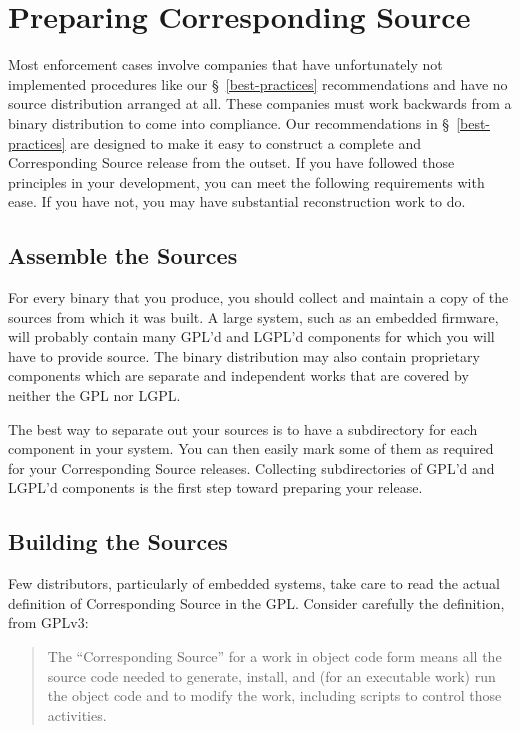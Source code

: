 \section{Preparing Corresponding Source}
\label{corresponding-source}

Most enforcement cases involve companies that have unfortunately not
implemented procedures like our \S~\ref{best-practices} recommendations
and have no source distribution arranged at all.  These companies must
work backwards from a binary distribution to come into compliance.  Our
recommendations in \S~\ref{best-practices} are designed to make it easy to
construct a complete and Corresponding Source release from the outset.  If
you have followed those principles in your development, you can meet the
following requirements with ease.  If you have not, you may have
substantial reconstruction work to do.

\subsection{Assemble the Sources}

For every binary that you produce, you should collect and maintain a copy
of the sources from which it was built.  A large system, such as an
embedded firmware, will probably contain many GPL'd and LGPL'd components
for which you will have to provide source.  The binary distribution may
also contain proprietary components which are separate and independent
works that are covered by neither the GPL nor LGPL\@.

The best way to separate out your sources is to have a subdirectory for
each component in your system.  You can then easily mark some of them as
required for your Corresponding Source releases.  Collecting
subdirectories of GPL'd and LGPL'd components is the first step toward
preparing your release.

\subsection{Building the Sources}

Few distributors, particularly of embedded systems, take care to read the
actual definition of Corresponding Source in the GPL\@.  Consider
carefully the definition, from GPLv3:
\begin{quote}
  The ``Corresponding Source'' for a work in object code form means all
  the source code needed to generate, install, and (for an executable
  work) run the object code and to modify the work, including scripts to
  control those activities.
\end{quote}

